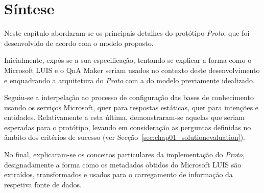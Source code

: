 \section{Síntese}
\label{sec:chap05_chaptersummary}
Neste capítulo abordaram-se os principais detalhes do protótipo \textit{Proto}, que foi desenvolvido de acordo com o modelo proposto. 

Inicialmente, expôs-se a sua especificação, tentando-se explicar a forma como o Microsoft LUIS e o QnA Maker seriam usados no contexto deste desenvolvimento e enquadrando a arquitetura do \textit{Proto} com a do modelo previamente idealizado.

Seguiu-se a interpelação ao processo de configuração das bases de conhecimento usando os serviços Microsoft, quer para respostas estáticas, quer para intenções e entidades. Relativamente a esta última, demonstraram-se aquelas que seriam esperadas para o protótipo, levando em consideração as perguntas definidas no âmbito dos critérios de sucesso (ver Secção~\ref{sec:chap01_solutionevaluation}).

No final, explicaram-se os conceitos particulares da implementação do \textit{Proto}, designadamente a forma como os metadados obtidos do Microsoft LUIS são extraídos, transformados e usados para o carregamento de informação da respetiva fonte de dados.